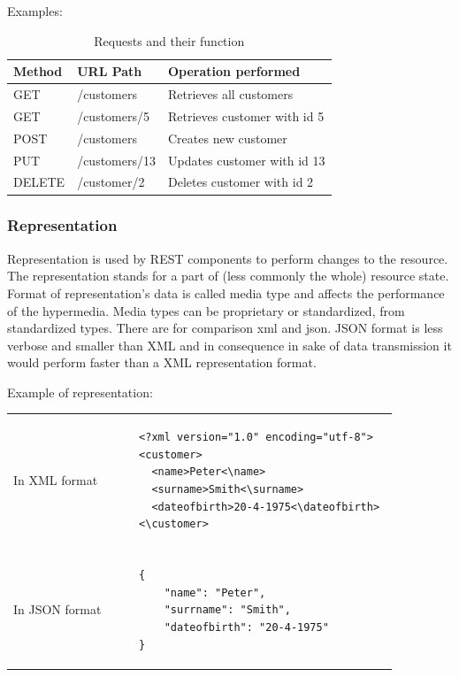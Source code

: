 Examples: \\
\begin{table}
\caption{Requests and their function}
\begin{center}
\begin{tabular}{l l l}
Method & URL Path & Operation performed \\ \hline
GET & /customers & Retrieves all customers \\
GET & /customers/5 & Retrieves customer with id 5 \\
POST & /customers & Creates new customer \\
PUT & /customers/13 & Updates customer with id 13 \\
DELETE & /customer/2 & Deletes customer with id 2 \\
\end{tabular}
\end{center}
\end{table}

\subsubsection{Representation}
  Representation is used by REST components to perform changes to the resource. The representation stands for a part of (less commonly the whole) resource state. Format of representation's data is called media type and affects the performance of the \gls{hypermedia}. Media types can be proprietary or standardized, from standardized types. There are for comparison \gls{xml} and \gls{json}. JSON format is less verbose and smaller than XML and in consequence in sake of data transmission it would perform faster than a XML representation format.
  
Example of representation:
\begin{center}
  \begin{tabular}[b]{l l}
    In XML format & \begin{lstlisting}
    <?xml version="1.0" encoding="utf-8">
    <customer> 
      <name>Peter<\name> 
      <surname>Smith<\surname> 
      <dateofbirth>20-4-1975<\dateofbirth> 
    <\customer>
    \end{lstlisting} \\
    
\\
    
    In JSON format & \begin{lstlisting}
    {
        "name": "Peter", 
        "surrname": "Smith", 
        "dateofbirth": "20-4-1975"
    }
    \end{lstlisting}
  \end{tabular}
\end{center}

